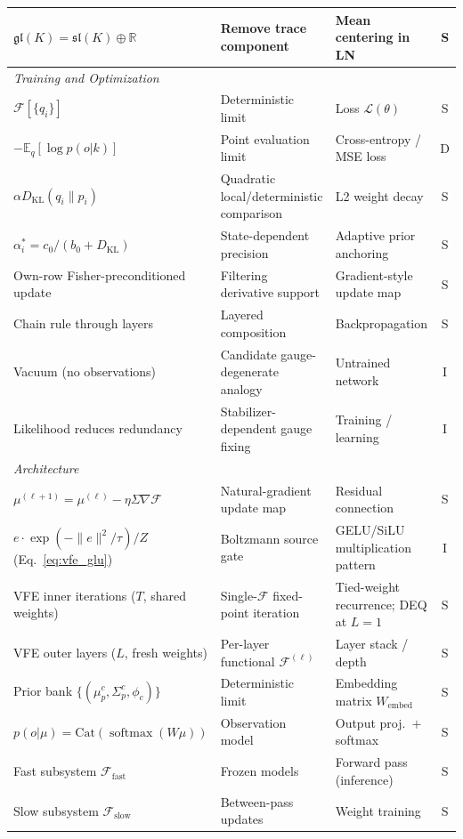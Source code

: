\documentclass[twoside,11pt]{article}
\newcommand{\softmax}{\operatorname{softmax}}
\newcommand{\KL}{\operatorname{KL}}
\begin{document}
\begin{table}[p]
\begin{tabular}{|l|l|l|c|}
$\mathfrak{gl}(K) = \mathfrak{sl}(K) \oplus \mathbb{R}$ & Remove trace component & Mean centering in LN & S \\
\hline
\multicolumn{4}{|l|}{\textit{Training and Optimization}} \\
\hline
$\mathcal{F}[\{q_i\}]$ & Deterministic limit & Loss $\mathcal{L}(\theta)$ & S \\
$-\mathbb{E}_q[\log p(o|k)]$ & Point evaluation limit & Cross-entropy / MSE loss & D \\
$\alpha D_{\KL}(q_i \| p_i)$ & Quadratic local/deterministic comparison & L2 weight decay & S \\
$\alpha_i^* = c_0/(b_0 + D_{\KL})$ & State-dependent precision & Adaptive prior anchoring & S \\
Own-row Fisher-preconditioned update & Filtering derivative support & Gradient-style update map & S \\
Chain rule through layers & Layered composition & Backpropagation & S \\
Vacuum (no observations) & Candidate gauge-degenerate analogy & Untrained network & I \\
Likelihood reduces redundancy & Stabilizer-dependent gauge fixing & Training / learning & I \\
\hline
\multicolumn{4}{|l|}{\textit{Architecture}} \\
\hline
$\mu^{(\ell+1)} = \mu^{(\ell)} - \eta \Sigma\nabla\mathcal{F}$ & Natural-gradient update map & Residual connection & S \\
$e \cdot \exp(-\|e\|^2/\tau)/Z$ (Eq.~\ref{eq:vfe_glu}) & Boltzmann source gate & GELU/SiLU multiplication pattern & I \\
VFE inner iterations ($T$, shared weights) & Single-$\mathcal{F}$ fixed-point iteration & Tied-weight recurrence; DEQ at $L = 1$ & S \\
VFE outer layers ($L$, fresh weights) & Per-layer functional $\mathcal{F}^{(\ell)}$ & Layer stack / depth & S \\
Prior bank $\{(\mu_p^c, \Sigma_p^c, \phi_c)\}$ & Deterministic limit & Embedding matrix $W_{\text{embed}}$ & S \\
$p(o|\mu) = \mathrm{Cat}(\softmax(W\mu))$ & Observation model & Output proj.\ $+$ softmax & S \\
Fast subsystem $\mathcal{F}_{\text{fast}}$ & Frozen models & Forward pass (inference) & S \\
Slow subsystem $\mathcal{F}_{\text{slow}}$ & Between-pass updates & Weight training & S \\

\end{tabular}
\end{table}
\end{document}
